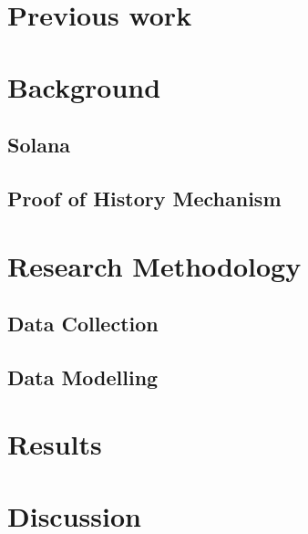 \documentclass[10pt, conference, compsocconf]{IEEEtran}
\begin{document}

\section{Previous work}

\section{Background}
\label{sec:background}





\subsection{Solana}




\subsection{Proof of History Mechanism}


\section{Research Methodology}


\subsection{Data Collection}

\subsection{Data Modelling}



\section{Results}

\section{Discussion}



\end{document}
